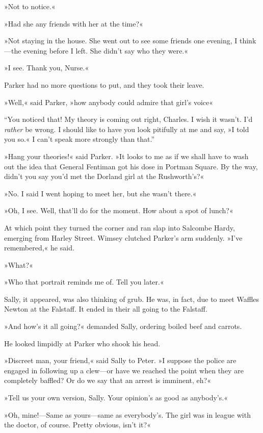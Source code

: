 »Not to notice.«

»Had she any friends with her at the time?«

»Not staying in the house. She went out to see some friends one evening, I think\allowbreak---\allowbreak the evening before I left. She didn't say who they were.«

»I see. Thank you, Nurse.«

Parker had no more questions to put, and they took their leave.

»Well,« said Parker, »how anybody could admire that girl's voice\longdash«

\enquote{You noticed that! My theory is coming out right, Charles. I wish it wasn't. I'd \textit{rather} be wrong. I should like to have you look pitifully at me and say, »I told you so.« I can't speak more strongly than that.}

»Hang your theories!« said Parker. »It looks to me as if we shall have to wash out the idea that General Fentiman got his dose in Portman Square. By the way, didn't you say you'd met the Dorland girl at the Rushworth's?«

»No. I said I went hoping to meet her, but she wasn't there.«

»Oh, I see. Well, that'll do for the moment. How about a spot of lunch?«

At which point they turned the corner and ran slap into Salcombe Hardy, emerging from Harley Street. Wimsey clutched Parker's arm suddenly. »I've remembered,« he said.

»What?«

»Who that portrait reminds me of. Tell you later.«

Sally, it appeared, was also thinking of grub. He was, in fact, due to meet Waffles Newton at the Falstaff. It ended in their all going to the Falstaff.

»And how's it all going?« demanded Sally, ordering boiled beef and carrots.

He looked limpidly at Parker who shook his head.

»Discreet man, your friend,« said Sally to Peter. »I suppose the police are engaged in following up a clew\allowbreak---\allowbreak or have we reached the point when they are completely baffled? Or do we say that an arrest is imminent, eh?«

»Tell us your own version, Sally. Your opinion's as good as anybody's.«

»Oh, mine!---Same as yours\allowbreak---\allowbreak same as everybody's. The girl was in league with the doctor, of course. Pretty obvious, isn't it?«

